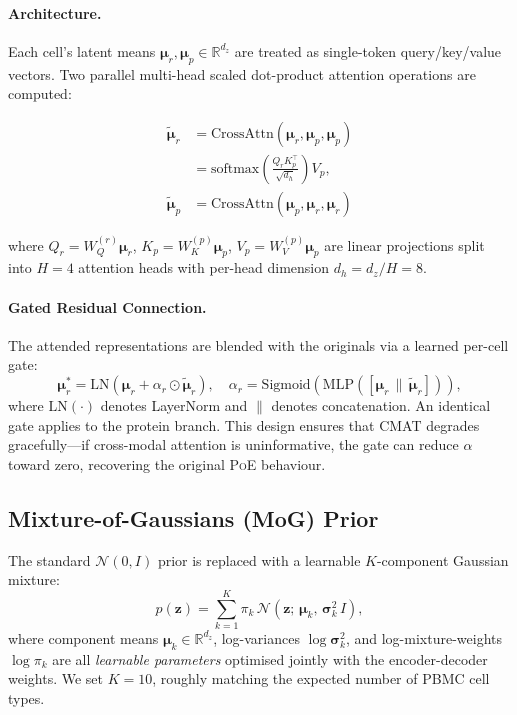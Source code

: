 \documentclass[11pt,a4paper]{article}
\newcommand{\cmat}{\textsc{CMAT}}
\newcommand{\poe}{\textsc{PoE}}
\newcommand{\RR}{\mathbb{R}}
\newcommand{\bz}{\mathbf{z}}
\newcommand{\bmu}{\boldsymbol{\mu}}
\newcommand{\bsig}{\boldsymbol{\sigma}}
\begin{document}
\paragraph{Architecture.}
Each cell's latent means $\bmu_r, \bmu_p \in \RR^{d_z}$ are treated as single-token query/key/value vectors.
Two parallel multi-head scaled dot-product attention operations are computed:

\begin{align}
  \tilde{\bmu}_r &= \text{CrossAttn}(\bmu_r, \bmu_p, \bmu_p) \label{eq:cmat_rna}\\
  &= \text{softmax}\!\left(\frac{Q_r K_p^\top}{\sqrt{d_h}}\right)V_p, \nonumber \\
  \tilde{\bmu}_p &= \text{CrossAttn}(\bmu_p, \bmu_r, \bmu_r) \label{eq:cmat_prot}
\end{align}

where $Q_r = W_Q^{(r)}\bmu_r$, $K_p = W_K^{(p)}\bmu_p$, $V_p = W_V^{(p)}\bmu_p$ are linear projections split into $H=4$ attention heads with per-head dimension $d_h = d_z / H = 8$.

\paragraph{Gated Residual Connection.}
The attended representations are blended with the originals via a learned per-cell gate:
\begin{equation}\label{eq:gate}
  \bmu_r^* = \text{LN}\!\left(\bmu_r + \alpha_r \odot \tilde{\bmu}_r\right), \quad
  \alpha_r = \text{Sigmoid}\!\left(\text{MLP}([\bmu_r \,\|\, \tilde{\bmu}_r])\right),
\end{equation}
where $\text{LN}(\cdot)$ denotes LayerNorm and $\|$ denotes concatenation.
An identical gate applies to the protein branch.
This design ensures that \cmat{} degrades gracefully---if cross-modal attention is uninformative, the gate can reduce $\alpha$ toward zero, recovering the original \poe{} behaviour.

\subsection{Mixture-of-Gaussians (MoG) Prior}\label{ssec:mog}

The standard $\mathcal{N}(0,I)$ prior is replaced with a learnable $K$-component Gaussian mixture:
\begin{equation}\label{eq:mog}
  p(\bz) = \sum_{k=1}^{K}\pi_k\,\mathcal{N}(\bz;\, \bmu_k,\, \bsig_k^2\,I),
\end{equation}
where component means $\bmu_k \in \RR^{d_z}$, log-variances $\log\bsig_k^2$, and log-mixture-weights $\log\pi_k$ are all \emph{learnable parameters} optimised jointly with the encoder-decoder weights.
We set $K=10$, roughly matching the expected number of PBMC cell types.
\end{document}
